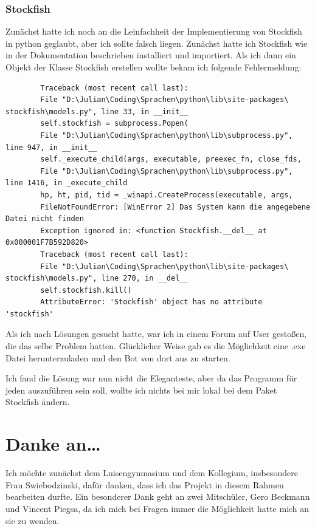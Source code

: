 \documentclass[a4paper, 10pt]{scrartcl}
\begin{document}
\subsubsection{Stockfish}
Zunächst hatte ich noch an die Leinfachheit der Implementierung von Stockfish in
python geglaubt, aber ich sollte falsch liegen. Zunächst hatte ich Stockfish wie in
der Dokumentation beschrieben installiert und importiert. Als ich dann ein Objekt der
Klasse \glqq Stockfish\grqq{} erstellen wollte bekam ich folgende Fehlermeldung:
\begin{lstlisting}
        Traceback (most recent call last):
        File "D:\Julian\Coding\Sprachen\python\lib\site-packages\ stockfish\models.py", line 33, in __init__
        self.stockfish = subprocess.Popen(
        File "D:\Julian\Coding\Sprachen\python\lib\subprocess.py", line 947, in __init__
        self._execute_child(args, executable, preexec_fn, close_fds,
        File "D:\Julian\Coding\Sprachen\python\lib\subprocess.py", line 1416, in _execute_child
        hp, ht, pid, tid = _winapi.CreateProcess(executable, args,
        FileNotFoundError: [WinError 2] Das System kann die angegebene Datei nicht finden
        Exception ignored in: <function Stockfish.__del__ at 0x000001F7B592D820>
        Traceback (most recent call last):
        File "D:\Julian\Coding\Sprachen\python\lib\site-packages\ stockfish\models.py", line 270, in __del__
        self.stockfish.kill()
        AttributeError: 'Stockfish' object has no attribute 'stockfish'
\end{lstlisting}
Als ich nach Lösungen gesucht hatte, war ich in einem Forum auf User gestoßen,
die das selbe Problem hatten. Glücklicher Weise gab es die Möglichkeit eine .exe
Datei herunterzuladen und den Bot von dort aus zu starten. 

Ich fand die Lösung war nun nicht die Eleganteste, aber da das Programm für jeden
auszuführen sein soll, wollte ich nichts bei mir lokal bei dem Paket \glqq Stockfish\grqq{} ändern. 

\section{Danke an\dots{}}
Ich möchte zunächst dem Luisengymnasium und dem Kollegium, insbesondere Frau
Swiebodzinski, dafür danken, dass ich das Projekt in diesem Rahmen bearbeiten durfte. 
Ein besonderer Dank geht an zwei Mitschüler, Gero Beckmann und Vincent Piegsa, da ich
mich bei Fragen immer die Möglichkeit hatte mich an sie zu wenden.
\end{document}

